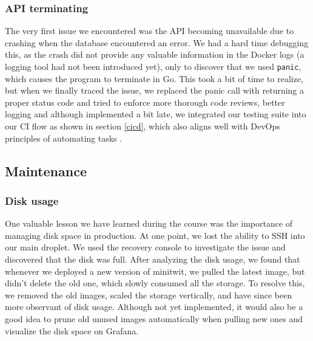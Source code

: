 \subsubsection{API terminating}
The very first issue we encountered was the API becoming unavailable due to crashing when the database encountered an error. We had a hard time debugging this, as the crash did not provide any valuable information in the Docker logs (a logging tool had not been introduced yet), only to discover that we used \texttt{panic}, which causes the program to terminate in Go. This took a bit of time to realize, but when we finally traced the issue, we replaced the panic call with returning a proper status code and tried to enforce more thorough code reviews, better logging and although implemented a bit late, we integrated our testing suite into our CI flow as shown in section \ref{cicd}, which also aligns well with DevOps principles of automating tasks \cite{devopsculture}.

\subsection{Maintenance}\label{maintainence}
\subsubsection{Disk usage}
One valuable lesson we have learned during the course was the importance of managing disk space in production. At one point, we lost the ability to SSH into our main droplet. We used the recovery console to investigate the issue and discovered that the disk was full. After analyzing the disk usage, we found that whenever we deployed a new version of minitwit, we pulled the latest image, but didn't delete the old one, which slowly consumed all the storage. To resolve this, we removed the old images, scaled the storage vertically, and have since been more observant of disk usage. Although not yet implemented, it would also be a good idea to prune old unused images automatically when pulling new ones and visualize the disk space on Grafana.

